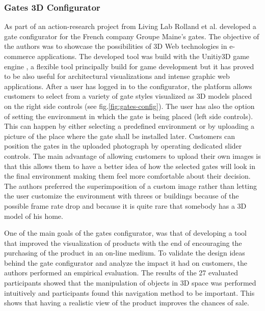 \documentclass[../medieninformatik-arbeit.tex]{subfiles}
\begin{document}
\subsubsection{Gates 3D Configurator}
As part of an action-research project from Living
Lab \cite{livinglabs:2015:Online} Rolland et al. \cite{rolland2012commerce}
developed a gate configurator for the French company Groupe Maine's gates. The
objective of the authors was to showcase the possibilities of 3D Web
technologies in e-commerce applications. The developed tool was build with the
Unitiy3D game engine \cite{unity3d:2015:Online}, a flexible tool principally
build for game development but it has proved to be also useful for architectural
visualizations and intense graphic web applications. After a user has logged in
to the configurator, the platform allows customers to select from a variety of
gate styles visualized as 3D models placed on the right side controls (see fig.\ref{fig:gates-config}). The user has also the option of setting the environment in which the gate is being placed (left side controls). This can happen by either selecting a predefined environment or by uploading a picture of the place where the gate shall be installed later. Customers can position the gates in the uploaded photograph by operating dedicated slider controls. The main advantage of allowing customers to upload their own images is that this allows them to have a better idea of how the selected gates will look in the final environment making them feel more comfortable about their decision. The authors preferred the superimposition of a custom image rather than letting the user customize the environment with threes or buildings because of the possible frame rate drop and because it is quite rare that somebody has a 3D model of his home. 

One of the main goals of the gates configurator, was that of developing a tool that improved the visualization of products with the end of encouraging the purchasing of the product in an on-line medium. To validate the design ideas behind the gate configurator and analyze the impact it had on customers, the authors performed an empirical evaluation. The results of the 27 evaluated participants showed that the manipulation of objects in 3D space was performed intuitively and participants found this navigation method to be important. This shows that having a realistic view of the product improves the chances of sale.
\end{document}
